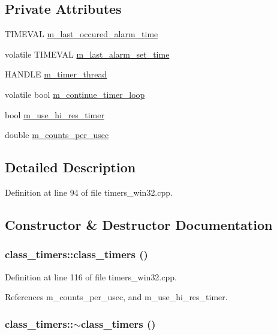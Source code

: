 \subsection*{Private Attributes}
\begin{CompactItemize}
\item 
TIMEVAL \hyperlink{classclass__timers_01c07cb9949b61fce137e60a54d001b9}{m\_\-last\_\-occured\_\-alarm\_\-time}
\item 
volatile TIMEVAL \hyperlink{classclass__timers_d45784e3a40494a35d5684ab8df0bfc9}{m\_\-last\_\-alarm\_\-set\_\-time}
\item 
HANDLE \hyperlink{classclass__timers_8d08585f4ba63c21b4636863499b9e05}{m\_\-timer\_\-thread}
\item 
volatile bool \hyperlink{classclass__timers_957a0cc71456a57fd5cb640122fe924a}{m\_\-continue\_\-timer\_\-loop}
\item 
bool \hyperlink{classclass__timers_5fdc6eb0abb2689d078b333b083bfcb0}{m\_\-use\_\-hi\_\-res\_\-timer}
\item 
double \hyperlink{classclass__timers_5bf844fdbe2e70ab6e3e832f688d382b}{m\_\-counts\_\-per\_\-usec}
\end{CompactItemize}


\subsection{Detailed Description}




Definition at line 94 of file timers\_\-win32.cpp.

\subsection{Constructor \& Destructor Documentation}
\hypertarget{classclass__timers_924a91ae96d721dd432136351c925d9f}{
\subsubsection[class\_\-timers]{\setlength{\rightskip}{0pt plus 5cm}class\_\-timers::class\_\-timers ()}}
\label{classclass__timers_924a91ae96d721dd432136351c925d9f}




Definition at line 116 of file timers\_\-win32.cpp.

References m\_\-counts\_\-per\_\-usec, and m\_\-use\_\-hi\_\-res\_\-timer.\hypertarget{classclass__timers_6fd261041314ddd3ada9537530d02afd}{
\subsubsection[$\sim$class\_\-timers]{\setlength{\rightskip}{0pt plus 5cm}class\_\-timers::$\sim$class\_\-timers ()}}
\label{classclass__timers_6fd261041314ddd3ada9537530d02afd}




